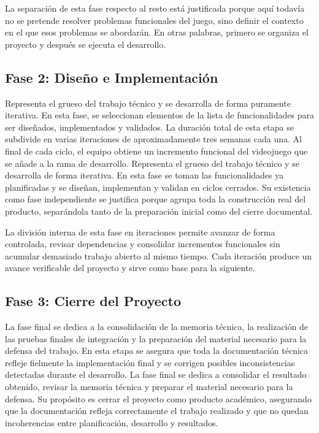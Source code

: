 La separación de esta fase respecto al resto está justificada porque aquí todavía no se pretende resolver problemas funcionales del juego, sino definir el contexto en el que esos problemas se abordarán. En otras palabras, primero se organiza el proyecto y después se ejecuta el desarrollo.

\subsection{Fase 2: Diseño e Implementación}
Representa el grueso del trabajo técnico y se desarrolla de forma puramente iterativa. En esta fase, se seleccionan elementos de la lista de funcionalidades para ser diseñados, implementados y validados. La duración total de esta etapa se subdivide en varias iteraciones de aproximadamente tres semanas cada una. Al final de cada ciclo, el equipo obtiene un incremento funcional del videojuego que se añade a la rama de desarrollo.
Representa el grueso del trabajo técnico y se desarrolla de forma iterativa. En esta fase se toman las funcionalidades ya planificadas y se diseñan, implementan y validan en ciclos cerrados. Su existencia como fase independiente se justifica porque agrupa toda la construcción real del producto, separándola tanto de la preparación inicial como del cierre documental.

La división interna de esta fase en iteraciones permite avanzar de forma controlada, revisar dependencias y consolidar incrementos funcionales sin acumular demasiado trabajo abierto al mismo tiempo. Cada iteración produce un avance verificable del proyecto y sirve como base para la siguiente.

\subsection{Fase 3: Cierre del Proyecto}
La fase final se dedica a la consolidación de la memoria técnica, la realización de las pruebas finales de integración y la preparación del material necesario para la defensa del trabajo. En esta etapa se asegura que toda la documentación técnica refleje fielmente la implementación final y se corrigen posibles inconsistencias detectadas durante el desarrollo.
La fase final se dedica a consolidar el resultado obtenido, revisar la memoria técnica y preparar el material necesario para la defensa. Su propósito es cerrar el proyecto como producto académico, asegurando que la documentación refleja correctamente el trabajo realizado y que no quedan incoherencias entre planificación, desarrollo y resultados.

